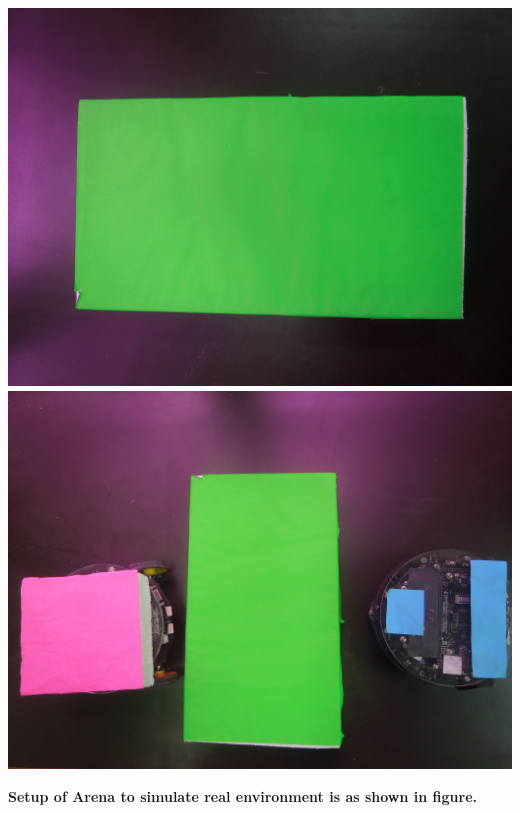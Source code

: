 \documentclass[report]{res}
\begin{document}
	\begin{center}
	\includegraphics[scale = 0.05]{graphics/pics/DSCN0045.jpg}
	\includegraphics[scale = 0.05]{graphics/pics/DSCN0046.jpg}\\
	\end{center}
	
	\pagebreak
	
	
	\textbf{\large Setup of Arena to simulate real environment is as shown in figure.}
	
\end{document}
